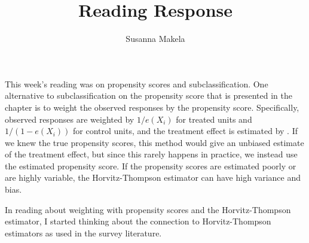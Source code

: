 \documentclass[10pt,a4paper]{article}
\author{Susanna Makela}
\title{Reading Response}
\begin{document}
\maketitle

This week's reading was on propensity scores and subclassification. One alternative to subclassification on the propensity score that is presented in the chapter is to weight the observed responses by the propensity score. Specifically, observed responses are weighted by $1/e(X_i)$ for treated units and $1/(1-e(X_i))$ for control units, and the treatment effect is estimated by
. If we knew the true propensity scores, this method would give an unbiased estimate of the treatment effect, but since this rarely happens in practice, we instead use the estimated propensity score. If the propensity scores are estimated poorly or are highly variable, the Horvitz-Thompson estimator can have high variance and bias.

In reading about weighting with propensity scores and the Horvitz-Thompson estimator, I started thinking about the connection to Horvitz-Thompson estimators as used in the survey literature.
\end{document}
